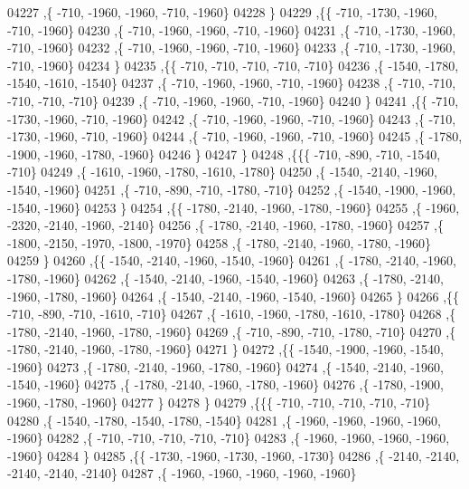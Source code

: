 \begin{DoxyCode}
04227     ,\{  -710, -1960, -1960,  -710, -1960\}
04228     \}
04229    ,\{\{  -710, -1730, -1960,  -710, -1960\}
04230     ,\{  -710, -1960, -1960,  -710, -1960\}
04231     ,\{  -710, -1730, -1960,  -710, -1960\}
04232     ,\{  -710, -1960, -1960,  -710, -1960\}
04233     ,\{  -710, -1730, -1960,  -710, -1960\}
04234     \}
04235    ,\{\{  -710,  -710,  -710,  -710,  -710\}
04236     ,\{ -1540, -1780, -1540, -1610, -1540\}
04237     ,\{  -710, -1960, -1960,  -710, -1960\}
04238     ,\{  -710,  -710,  -710,  -710,  -710\}
04239     ,\{  -710, -1960, -1960,  -710, -1960\}
04240     \}
04241    ,\{\{  -710, -1730, -1960,  -710, -1960\}
04242     ,\{  -710, -1960, -1960,  -710, -1960\}
04243     ,\{  -710, -1730, -1960,  -710, -1960\}
04244     ,\{  -710, -1960, -1960,  -710, -1960\}
04245     ,\{ -1780, -1900, -1960, -1780, -1960\}
04246     \}
04247    \}
04248   ,\{\{\{  -710,  -890,  -710, -1540,  -710\}
04249     ,\{ -1610, -1960, -1780, -1610, -1780\}
04250     ,\{ -1540, -2140, -1960, -1540, -1960\}
04251     ,\{  -710,  -890,  -710, -1780,  -710\}
04252     ,\{ -1540, -1900, -1960, -1540, -1960\}
04253     \}
04254    ,\{\{ -1780, -2140, -1960, -1780, -1960\}
04255     ,\{ -1960, -2320, -2140, -1960, -2140\}
04256     ,\{ -1780, -2140, -1960, -1780, -1960\}
04257     ,\{ -1800, -2150, -1970, -1800, -1970\}
04258     ,\{ -1780, -2140, -1960, -1780, -1960\}
04259     \}
04260    ,\{\{ -1540, -2140, -1960, -1540, -1960\}
04261     ,\{ -1780, -2140, -1960, -1780, -1960\}
04262     ,\{ -1540, -2140, -1960, -1540, -1960\}
04263     ,\{ -1780, -2140, -1960, -1780, -1960\}
04264     ,\{ -1540, -2140, -1960, -1540, -1960\}
04265     \}
04266    ,\{\{  -710,  -890,  -710, -1610,  -710\}
04267     ,\{ -1610, -1960, -1780, -1610, -1780\}
04268     ,\{ -1780, -2140, -1960, -1780, -1960\}
04269     ,\{  -710,  -890,  -710, -1780,  -710\}
04270     ,\{ -1780, -2140, -1960, -1780, -1960\}
04271     \}
04272    ,\{\{ -1540, -1900, -1960, -1540, -1960\}
04273     ,\{ -1780, -2140, -1960, -1780, -1960\}
04274     ,\{ -1540, -2140, -1960, -1540, -1960\}
04275     ,\{ -1780, -2140, -1960, -1780, -1960\}
04276     ,\{ -1780, -1900, -1960, -1780, -1960\}
04277     \}
04278    \}
04279   ,\{\{\{  -710,  -710,  -710,  -710,  -710\}
04280     ,\{ -1540, -1780, -1540, -1780, -1540\}
04281     ,\{ -1960, -1960, -1960, -1960, -1960\}
04282     ,\{  -710,  -710,  -710,  -710,  -710\}
04283     ,\{ -1960, -1960, -1960, -1960, -1960\}
04284     \}
04285    ,\{\{ -1730, -1960, -1730, -1960, -1730\}
04286     ,\{ -2140, -2140, -2140, -2140, -2140\}
04287     ,\{ -1960, -1960, -1960, -1960, -1960\}

\end{DoxyCode}
